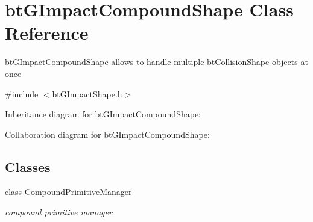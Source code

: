 \hypertarget{classbt_g_impact_compound_shape}{\section{bt\+G\+Impact\+Compound\+Shape Class Reference}
\label{classbt_g_impact_compound_shape}
}


\hyperlink{classbt_g_impact_compound_shape}{bt\+G\+Impact\+Compound\+Shape} allows to handle multiple bt\+Collision\+Shape objects at once  




{\ttfamily \#include $<$bt\+G\+Impact\+Shape.\+h$>$}



Inheritance diagram for bt\+G\+Impact\+Compound\+Shape\+:


Collaboration diagram for bt\+G\+Impact\+Compound\+Shape\+:
\subsection*{Classes}
\begin{DoxyCompactItemize}
\item 
class \hyperlink{classbt_g_impact_compound_shape_1_1_compound_primitive_manager}{Compound\+Primitive\+Manager}
\begin{DoxyCompactList}\small\item\em compound primitive manager \end{DoxyCompactList}\end{DoxyCompactItemize}
